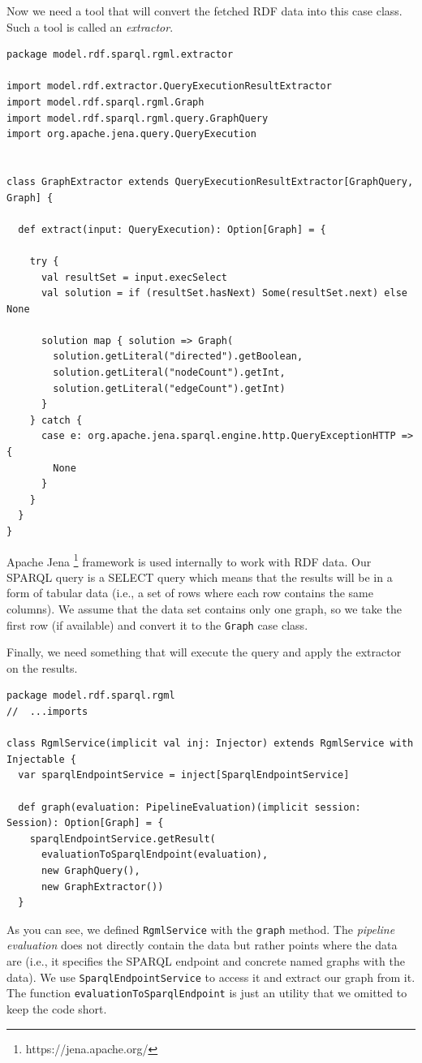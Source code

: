 Now we need a tool that will convert the fetched RDF data into this case class. Such a tool is called an \emph{extractor}.

\begin{verbatim}
package model.rdf.sparql.rgml.extractor

import model.rdf.extractor.QueryExecutionResultExtractor
import model.rdf.sparql.rgml.Graph
import model.rdf.sparql.rgml.query.GraphQuery
import org.apache.jena.query.QueryExecution


class GraphExtractor extends QueryExecutionResultExtractor[GraphQuery, Graph] {

  def extract(input: QueryExecution): Option[Graph] = {

    try {
      val resultSet = input.execSelect
      val solution = if (resultSet.hasNext) Some(resultSet.next) else None

      solution map { solution => Graph(
        solution.getLiteral("directed").getBoolean,
        solution.getLiteral("nodeCount").getInt,
        solution.getLiteral("edgeCount").getInt)
      }
    } catch {
      case e: org.apache.jena.sparql.engine.http.QueryExceptionHTTP => {
        None
      }
    }
  }
}
\end{verbatim}

Apache Jena \footnote{https://jena.apache.org/} framework is used internally to work with RDF data. Our SPARQL query is a SELECT query which means that the results will be in a form of tabular data (i.e., a set of rows where each row contains the same columns). We assume that the data set contains only one graph, so we take the first row (if available) and convert it to the \texttt{Graph} case class.

Finally, we need something that will execute the query and apply the extractor on the results.

\begin{verbatim}
package model.rdf.sparql.rgml
//  ...imports

class RgmlService(implicit val inj: Injector) extends RgmlService with Injectable {
  var sparqlEndpointService = inject[SparqlEndpointService]

  def graph(evaluation: PipelineEvaluation)(implicit session: Session): Option[Graph] = {
    sparqlEndpointService.getResult(
      evaluationToSparqlEndpoint(evaluation),
      new GraphQuery(),
      new GraphExtractor())
  }
\end{verbatim}

As you can see, we defined \texttt{RgmlService} with the \texttt{graph} method. The \emph{pipeline evaluation} does not directly contain the data but rather points where the data are (i.e., it specifies the SPARQL endpoint and concrete named graphs with the data). We use \texttt{SparqlEndpointService} to access it and extract our graph from it. The function \texttt{evaluationToSparqlEndpoint} is just an utility that we omitted to keep the code short. %

